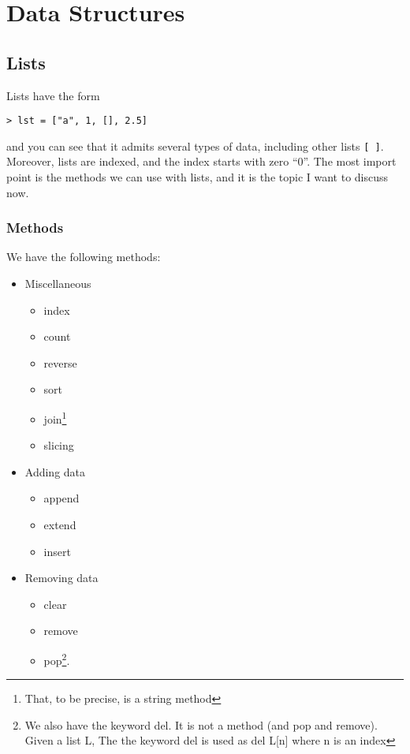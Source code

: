 
\section{Data Structures}

\subsection{Lists}

Lists have the form
\begin{verbatim}
> lst = ["a", 1, [], 2.5] 
\end{verbatim}
and you can see that it admits several types of data, including other lists \verb|[ ]|. Moreover, lists are indexed, and the index starts with zero ``0''. The most import point is the methods we can use with lists, and it is the topic I want to discuss now. 

\subsubsection{Methods}

We have the following methods:

\begin{itemize}
	\item Miscellaneous
	\begin{itemize}
		\item index
		\item count
		\item reverse
		\item sort
		\item join\footnote{That, to be precise, is a string method}
		\item slicing
	\end{itemize}
	
	\item Adding data
	\begin{itemize}
		\item append
		\item extend
		\item insert
	\end{itemize}
	
	\item Removing data
	\begin{itemize}
		\item clear
		\item remove
		\item pop\footnote{ We also have the keyword del. It is not a method (and pop and remove). 
            Given a list L, The the keyword del is used as del L[n] where n is an index}.
	\end{itemize}
\end{itemize}

